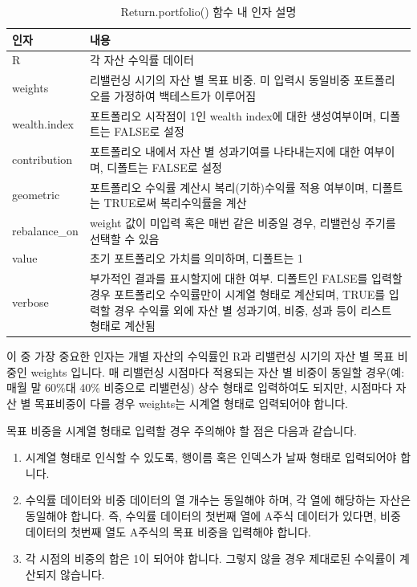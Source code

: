 \documentclass[12pt,]{book}
\providecommand{\tightlist}{%
  \setlength{\itemsep}{0pt}\setlength{\parskip}{0pt}}
\begin{document}
\begin{table}[!h]

\caption{\label{tab:returnportarg}Return.portfolio() 함수 내 인자 설명}
\centering
\begin{tabular}{>{\centering\arraybackslash}p{2cm}>{\centering\arraybackslash}p{10cm}}
\toprule
인자 & 내용\\
\midrule
\rowcolor{gray!6}  R & 각 자산 수익률 데이터\\
weights & 리밸런싱 시기의 자산 별 목표 비중. 미 입력시 동일비중 포트폴리오를 가정하여 백테스트가 이루어짐\\
\rowcolor{gray!6}  wealth.index & 포트폴리오 시작점이 1인 wealth index에 대한 생성여부이며, 디폴트는 FALSE로 설정\\
contribution & 포트폴리오 내에서 자산 별 성과기여를 나타내는지에 대한 여부이며, 디폴트는 FALSE로 설정\\
\rowcolor{gray!6}  geometric & 포트폴리오 수익률 계산시 복리(기하)수익률 적용 여부이며, 디폴트는 TRUE로써 복리수익률을 계산\\
\addlinespace
rebalance\_on & weight 값이 미입력 혹은 매번 같은 비중일 경우, 리밸런싱 주기를 선택할 수 있음\\
\rowcolor{gray!6}  value & 초기 포트폴리오 가치를 의미하며, 디폴트는 1\\
verbose & 부가적인 결과를 표시할지에 대한 여부. 디폴트인 FALSE를 입력할 경우 포트폴리오 수익률만이 시계열 형태로 계산되며, TRUE를 입력할 경우 수익률 외에 자산 별 성과기여, 비중, 성과 등이 리스트 형태로 계산됨\\
\bottomrule
\end{tabular}
\end{table}

이 중 가장 중요한 인자는 개별 자산의 수익률인 R과 리밸런싱 시기의 자산 별 목표 비중인 weights 입니다. 매 리밸런싱 시점마다 적용되는 자산 별 비중이 동일할 경우(예: 매월 말 60\%대 40\% 비중으로 리밸런싱) 상수 형태로 입력하여도 되지만, 시점마다 자산 별 목표비중이 다를 경우 weights는 시계열 형태로 입력되어야 합니다.

목표 비중을 시계열 형태로 입력할 경우 주의해야 할 점은 다음과 같습니다.

\begin{enumerate}
\def\labelenumi{\arabic{enumi}.}
\tightlist
\item
  시계열 형태로 인식할 수 있도록, 행이름 혹은 인덱스가 날짜 형태로 입력되어야 합니다.
\item
  수익률 데이터와 비중 데이터의 열 개수는 동일해야 하며, 각 열에 해당하는 자산은 동일해야 합니다. 즉, 수익률 데이터의 첫번째 열에 A주식 데이터가 있다면, 비중 데이터의 첫번째 열도 A주식의 목표 비중을 입력해야 합니다.
\item
  각 시점의 비중의 합은 1이 되어야 합니다. 그렇지 않을 경우 제대로된 수익률이 계산되지 않습니다.
\end{enumerate}
\end{document}
